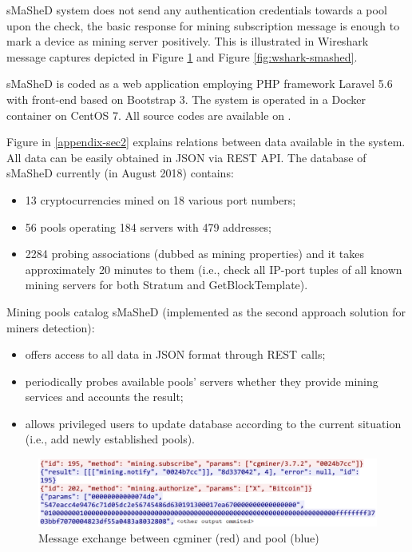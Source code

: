 \documentclass[preprint,12pt,3p]{elsarticle}
\begin{document}
sMaSheD system does not send any authentication credentials towards a pool upon the check, the basic response for mining subscription message is enough to mark a device as mining server positively. This is illustrated in Wireshark message captures depicted in Figure \ref{fig:wshark-cgminer} and Figure \ref{fig:wshark-smashed}.

sMaSheD is coded as a web application employing PHP framework Laravel 5.6 with front-end based on Bootstrap 3. The system is operated in a Docker container on CentOS 7. All source codes are available on \cite{GITHUB-SMASHED}. 

Figure in \ref{appendix-sec2} explains relations between data available in the system. All data can be easily obtained in JSON via REST API. The database of sMaSheD currently (in August 2018) contains:

\begin{itemize}
    \item 13 cryptocurrencies mined on 18 various port numbers;
    \item 56 pools operating 184 servers with 479 addresses;
    \item 2284 probing associations (dubbed as mining properties) and it takes approximately 20 minutes to them (i.e., check all IP-port tuples of all known mining servers for both Stratum and GetBlockTemplate).
\end{itemize}

Mining pools catalog sMaSheD (implemented as the second approach solution for miners detection):

\begin{itemize}
    \item offers access to all data in JSON format through REST calls;
    \item periodically probes available pools' servers whether they provide mining services and accounts the result;
    \item allows privileged users to update database according to the current situation (i.e., add newly established pools).
\end{itemize}

\begin{figure}[tp]
    \centering
    \includegraphics[width=\textwidth]{wshark-cgminer.png}
    \caption{Message exchange between cgminer (red) and pool (blue)}
    \label{fig:wshark-cgminer}
\end{figure}
\end{document}
